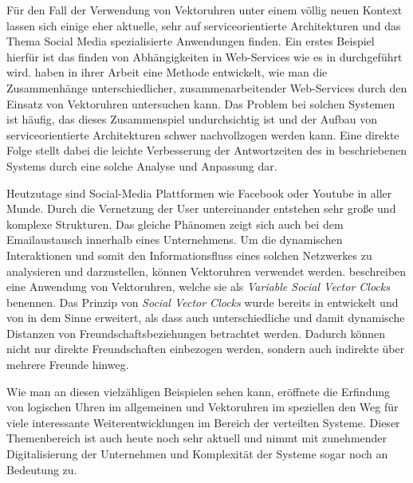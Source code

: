 Für den Fall der Verwendung von Vektoruhren unter einem völlig neuen Kontext lassen sich einige eher aktuelle, sehr auf serviceorientierte Architekturen und das Thema Social Media spezialisierte Anwendungen finden.
Ein erstes Beispiel hierfür ist das finden von Abhängigkeiten in Web-Services wie es in \cite{Romano2011} durchgeführt wird.  haben in ihrer Arbeit eine Methode entwickelt, wie man die Zusammenhänge unterschiedlicher, zusammenarbeitender Web-Services durch den Einsatz von Vektoruhren untersuchen kann. Das Problem bei solchen Systemen ist häufig, das dieses Zusammenspiel undurchsichtig ist und der Aufbau von serviceorientierte Architekturen schwer nachvollzogen werden kann. Eine direkte Folge stellt dabei die leichte Verbesserung der Antwortzeiten des in \cite{Romano2011} beschriebenen Systems durch eine solche Analyse und Anpassung dar.

Heutzutage sind Social-Media Plattformen wie Facebook oder Youtube in aller Munde. Durch die Vernetzung der User untereinander entstehen sehr große und komplexe Strukturen. Das gleiche Phänomen zeigt sich auch bei dem Emailaustausch innerhalb eines Unternehmens. Um die dynamischen Interaktionen und somit den Informationsfluss eines solchen Netzwerkes zu analysieren und darzustellen, können Vektoruhren verwendet werden.  \cite{Hsu2014} beschreiben eine Anwendung von Vektoruhren, welche sie als \textit{Variable Social Vector Clocks} benennen. Das Prinzip von \textit{Social Vector Clocks} wurde bereits in \cite{Kossinets2008} entwickelt und von  in dem Sinne erweitert, als dass auch unterschiedliche und damit dynamische Distanzen von Freundschaftsbeziehungen betrachtet werden. Dadurch können nicht nur direkte Freundschaften einbezogen werden, sondern auch indirekte über mehrere Freunde hinweg.

Wie man an diesen vielzähligen Beispielen sehen kann, eröffnete die Erfindung von logischen Uhren im allgemeinen und Vektoruhren im speziellen den Weg für viele interessante Weiterentwicklungen im Bereich der verteilten Systeme. Dieser Themenbereich ist auch heute noch sehr aktuell und nimmt mit zunehmender Digitalisierung der Unternehmen und Komplexität der Systeme sogar noch an Bedeutung zu.